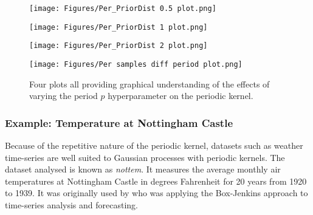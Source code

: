 \documentclass[12pt,a4paper]{article}
\begin{document}
\begin{figure}[h]
    \centering

    \begin{minipage}{0.45\textwidth}
        \centering
        \texttt{[image: Figures/Per\_PriorDist 0.5 plot.png]} %
        \label{fig:Per_PriorDist 0.5 plot}
    \end{minipage} 
    \begin{minipage}{0.45\textwidth}
        \centering
        \texttt{[image: Figures/Per\_PriorDist 1 plot.png]} %
        \label{fig:Per_PriorDist 1 plot}
    \end{minipage}

    \begin{minipage}{0.45\textwidth}
        \centering
        \texttt{[image: Figures/Per\_PriorDist 2 plot.png]} %
        \label{fig:Per_PriorDist 2 plot}
    \end{minipage} 
    \begin{minipage}{0.45\textwidth}
        \centering
        \texttt{[image: Figures/Per samples diff period plot.png]} %
        \label{fig:Per samples diff period plot}
    \end{minipage}

    \caption{Four plots all providing graphical understanding of the effects of varying the period \(p\) hyperparameter on the periodic kernel.}
    \label{fig:Per varying period plots}
\end{figure}

\subsubsection{Example: Temperature at Nottingham Castle}

Because of the repetitive nature of the periodic kernel, datasets such as weather time-series are well suited to Gaussian processes with periodic kernels. The dataset analysed is known as \textit{nottem}. It measures the average monthly air temperatures at Nottingham Castle in degrees Fahrenheit for 20 years from 1920 to 1939. It was originally used by \citet{anderson1976time} who was applying the Box-Jenkins approach to time-series analysis and forecasting.
\end{document}
